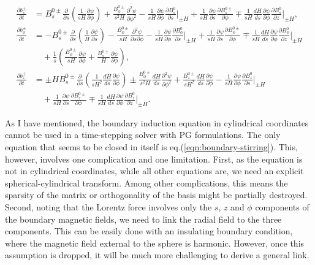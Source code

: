 \begin{equation}
    \begin{aligned}
        \frac{\partial b_s^\pm}{\partial t} &= B_s^{0\pm} \frac{\partial}{\partial s} \left(\frac{1}{sH}\frac{\partial \psi}{\partial \phi}\right) + \frac{B_\phi^{0\pm}}{s^2 H} \frac{\partial^2 \psi}{\partial \phi^2} - \frac{1}{sH} \frac{\partial \psi}{\partial \phi} \frac{\partial B_s^0}{\partial s}\bigg|_{\pm H} + \frac{1}{sH} \frac{\partial \psi}{\partial s} \frac{\partial B_s^{0\pm}}{\partial \phi} \mp \frac{1}{sH} \frac{dH}{ds}\frac{\partial \psi}{\partial \phi} \frac{\partial B_s^0}{\partial z}\bigg|_{\pm H}, \\ 
        \frac{\partial b_\phi^\pm}{\partial t} &= -B_s^{0\pm} \frac{\partial}{\partial s}\left(\frac{1}{H}\frac{\partial \psi}{\partial s}\right) - \frac{B_\phi^{0\pm}}{sH} \frac{\partial^2 \psi}{\partial s \partial \phi} - \frac{1}{sH} \frac{\partial \psi}{\partial \phi} \frac{\partial B_\phi^0}{\partial s}\bigg|_{\pm H} + \frac{1}{sH} \frac{\partial \psi}{\partial s} \frac{\partial B_\phi^{0\pm}}{\partial \phi} \mp \frac{1}{sH} \frac{dH}{ds}\frac{\partial \psi}{\partial \phi} \frac{\partial B_\phi^0}{\partial z}\bigg|_{\pm H} \\
        &\quad + \frac{1}{s}\left(\frac{B_\phi^{0\pm}}{sH}\frac{\partial \psi}{\partial \phi} + \frac{B_s^{0\pm}}{H}\frac{\partial \psi}{\partial \phi}\right), \\ 
        \frac{\partial b_z^\pm}{\partial t} &= \pm H B_s^{0\pm} \frac{\partial}{\partial s}\left(\frac{1}{sH^2}\frac{dH}{ds}\frac{\partial \psi}{\partial \phi}\right) \pm \frac{B_\phi^{0\pm}}{s^2 H} \frac{dH}{ds} \frac{\partial^2 \psi}{\partial \phi^2} + \frac{B_z^{0\pm}}{sH^2}\frac{dH}{ds}\frac{\partial \psi}{\partial \phi} - \frac{1}{sH}\frac{\partial \psi}{\partial \phi} \frac{\partial B_z^0}{\partial s}\bigg|_{\pm H} \\
        &\quad + \frac{1}{sH} \frac{\partial \psi}{\partial s} \frac{\partial B_z^{0\pm}}{\partial \phi} \mp \frac{1}{sH} \frac{dH}{ds}\frac{\partial \psi}{\partial \phi} \frac{\partial B_z^0}{\partial z}\bigg|_{\pm H}.
    \end{aligned}
\end{equation}

As I have mentioned, the boundary induction equation in cylindrical coordinates cannot be used in a time-stepping solver with PG formulations. The only equation that seems to be closed in itself is eq.(\ref{eqn:boundary-stirring}). This, however, involves one complication and one limitation. First, as the equation is not in cylindrical coordinates, while all other equations are, we need an explicit spherical-cylindrical transform. Among other complications, this means the sparsity of the matrix or orthogonality of the basis might be partially destroyed. Second, noting that the Lorentz force involves only the $s$, $z$ and $\phi$ components of the boundary magnetic fields, we need to link the radial field to the three components. This can be easily done with an insulating boundary condition, where the magnetic field external to the sphere is harmonic. However, once this assumption is dropped, it will be much more challenging to derive a general link.
